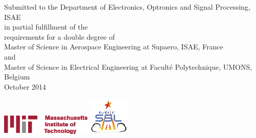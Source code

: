 \documentclass[12pt,twoside]{article}
\newcommand\blankpage{%
    \null
    \thispagestyle{empty}%
    \addtocounter{page}{-1}%
    \newpage}
\begin{document}
\begin{titlepage}
\begin{center}
{\large Submitted to the Department of Electronics, Optronics and Signal Processing, ISAE \\
in partial fulfillment of the \\
requirements for a double degree of \\
\vspace{20pt}
Master of Science in Aerospace Engineering at Supaero, ISAE, France}\\
\vspace{5pt}
and\\
\vspace{5pt}
{\large Master of Science in Electrical Engineering at Facult\'{e} Polytechnique, UMONS, Belgium}\\
\vspace{40pt}
{\Large October 2014}
\end{center}
\hspace{20pt}
\includegraphics[width=4.3cm]{img/mit.eps}
\hspace{320pt}
\includegraphics[width=2cm]{img/ssl.png}
\end{titlepage}
\afterpage{\blankpage}
\end{document}
